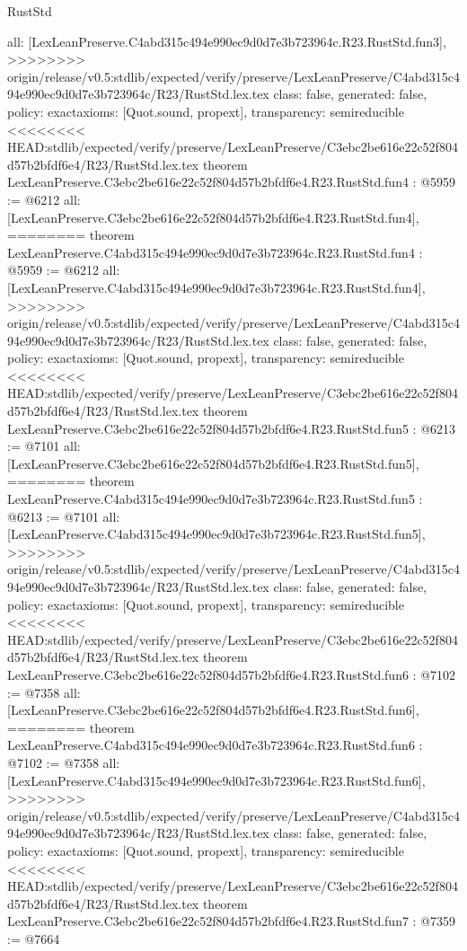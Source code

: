 \begin{lexlean}{RustStd}
\begin{coremodule}
{\begin{coremodule}
{{{{{{{  all: [LexLeanPreserve.C4abd315c494e990ec9d0d7e3b723964c.R23.RustStd.fun3],
>>>>>>>> origin/release/v0.5:stdlib/expected/verify/preserve/LexLeanPreserve/C4abd315c494e990ec9d0d7e3b723964c/R23/RustStd.lex.tex
  class: false,
  generated: false,
  policy: exact{axioms: [Quot.sound, propext]},
  transparency: semireducible
}
<<<<<<<< HEAD:stdlib/expected/verify/preserve/LexLeanPreserve/C3ebc2be616e22c52f804d57b2bfdf6e4/R23/RustStd.lex.tex
theorem LexLeanPreserve.C3ebc2be616e22c52f804d57b2bfdf6e4.R23.RustStd.fun4 : @5959 := @6212 {
  all: [LexLeanPreserve.C3ebc2be616e22c52f804d57b2bfdf6e4.R23.RustStd.fun4],
========
theorem LexLeanPreserve.C4abd315c494e990ec9d0d7e3b723964c.R23.RustStd.fun4 : @5959 := @6212 {
  all: [LexLeanPreserve.C4abd315c494e990ec9d0d7e3b723964c.R23.RustStd.fun4],
>>>>>>>> origin/release/v0.5:stdlib/expected/verify/preserve/LexLeanPreserve/C4abd315c494e990ec9d0d7e3b723964c/R23/RustStd.lex.tex
  class: false,
  generated: false,
  policy: exact{axioms: [Quot.sound, propext]},
  transparency: semireducible
}
<<<<<<<< HEAD:stdlib/expected/verify/preserve/LexLeanPreserve/C3ebc2be616e22c52f804d57b2bfdf6e4/R23/RustStd.lex.tex
theorem LexLeanPreserve.C3ebc2be616e22c52f804d57b2bfdf6e4.R23.RustStd.fun5 : @6213 := @7101 {
  all: [LexLeanPreserve.C3ebc2be616e22c52f804d57b2bfdf6e4.R23.RustStd.fun5],
========
theorem LexLeanPreserve.C4abd315c494e990ec9d0d7e3b723964c.R23.RustStd.fun5 : @6213 := @7101 {
  all: [LexLeanPreserve.C4abd315c494e990ec9d0d7e3b723964c.R23.RustStd.fun5],
>>>>>>>> origin/release/v0.5:stdlib/expected/verify/preserve/LexLeanPreserve/C4abd315c494e990ec9d0d7e3b723964c/R23/RustStd.lex.tex
  class: false,
  generated: false,
  policy: exact{axioms: [Quot.sound, propext]},
  transparency: semireducible
}
<<<<<<<< HEAD:stdlib/expected/verify/preserve/LexLeanPreserve/C3ebc2be616e22c52f804d57b2bfdf6e4/R23/RustStd.lex.tex
theorem LexLeanPreserve.C3ebc2be616e22c52f804d57b2bfdf6e4.R23.RustStd.fun6 : @7102 := @7358 {
  all: [LexLeanPreserve.C3ebc2be616e22c52f804d57b2bfdf6e4.R23.RustStd.fun6],
========
theorem LexLeanPreserve.C4abd315c494e990ec9d0d7e3b723964c.R23.RustStd.fun6 : @7102 := @7358 {
  all: [LexLeanPreserve.C4abd315c494e990ec9d0d7e3b723964c.R23.RustStd.fun6],
>>>>>>>> origin/release/v0.5:stdlib/expected/verify/preserve/LexLeanPreserve/C4abd315c494e990ec9d0d7e3b723964c/R23/RustStd.lex.tex
  class: false,
  generated: false,
  policy: exact{axioms: [Quot.sound, propext]},
  transparency: semireducible
}
<<<<<<<< HEAD:stdlib/expected/verify/preserve/LexLeanPreserve/C3ebc2be616e22c52f804d57b2bfdf6e4/R23/RustStd.lex.tex
theorem LexLeanPreserve.C3ebc2be616e22c52f804d57b2bfdf6e4.R23.RustStd.fun7 : @7359 := @7664 {
}}}}}}}}}}
\end{coremodule}}
\end{coremodule}
\end{lexlean}
